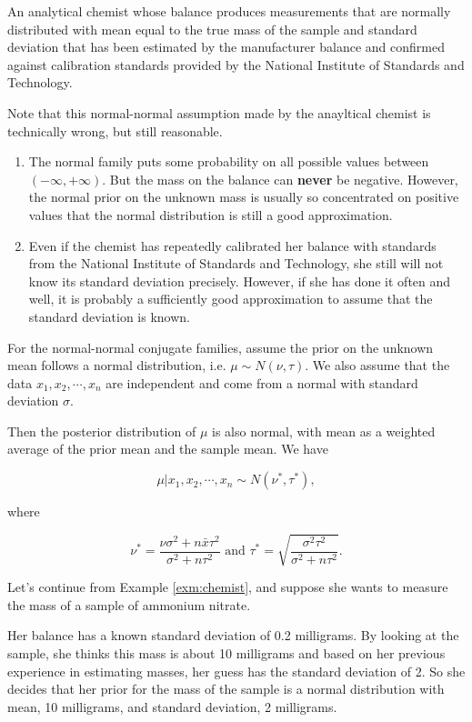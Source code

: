 \documentclass[]{book}
\theoremstyle{definition}
\theoremstyle{definition}
\theoremstyle{definition}
\theoremstyle{remark}
\let\BeginKnitrBlock\begin \let\EndKnitrBlock\end
\begin{document}
\BeginKnitrBlock{example}
\protect\hypertarget{exm:chemist}{}\label{exm:chemist} An analytical chemist
whose balance produces measurements that are normally distributed with
mean equal to the true mass of the sample and standard deviation that
has been estimated by the manufacturer balance and confirmed against
calibration standards provided by the National Institute of Standards
and Technology.

Note that this normal-normal assumption made by the anayltical chemist
is technically wrong, but still reasonable.

\begin{enumerate}
\def\labelenumi{\arabic{enumi}.}
\item
  The normal family puts some probability on all possible values between
  \((-\infty,+\infty)\). But the mass on the balance can \textbf{never}
  be negative. However, the normal prior on the unknown mass is usually
  so concentrated on positive values that the normal distribution is
  still a good approximation.
\item
  Even if the chemist has repeatedly calibrated her balance with
  standards from the National Institute of Standards and Technology, she
  still will not know its standard deviation precisely. However, if she
  has done it often and well, it is probably a sufficiently good
  approximation to assume that the standard deviation is known.
\end{enumerate}
\EndKnitrBlock{example}

For the normal-normal conjugate families, assume the prior on the
unknown mean follows a normal distribution, i.e.
\(\mu \sim N(\nu, \tau)\). We also assume that the data
\(x_1,x_2,\cdots,x_n\) are independent and come from a normal with
standard deviation \(\sigma\).

Then the posterior distribution of \(\mu\) is also normal, with mean as
a weighted average of the prior mean and the sample mean. We have

\[\mu|x_1,x_2,\cdots,x_n \sim N(\nu^*, \tau^*),\]

where

\[\nu^* = \frac{\nu\sigma^2 + n\bar{x}\tau^2}{\sigma^2 + n\tau^2} \text{ and } \tau^* = \sqrt{\frac{\sigma^2\tau^2}{\sigma^2 + n\tau^2}}.\]

Let's continue from Example \ref{exm:chemist}, and suppose she wants to
measure the mass of a sample of ammonium nitrate.

Her balance has a known standard deviation of 0.2 milligrams. By looking
at the sample, she thinks this mass is about 10 milligrams and based on
her previous experience in estimating masses, her guess has the standard
deviation of 2. So she decides that her prior for the mass of the sample
is a normal distribution with mean, 10 milligrams, and standard
deviation, 2 milligrams.
\end{document}
